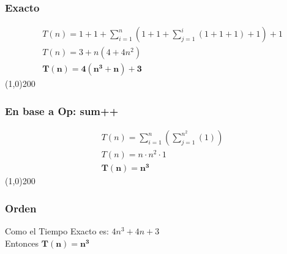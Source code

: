 \documentclass[letterpaper, fleqn]{report}
\begin{document}
\subsubsection*{Exacto}
\begin{align*}
&T(n) = 1+1+\sum_{i=1}^{n}\left(1+1+\sum_{j=1}^{i}{(1+1+1)}+1\right) + 1\\
&T(n) = 3 + n(4 + 4n^2)\\ 
&\mathbf{T(n) = 4(n^3+n)+3}
\end{align*}
\line(1,0){200}
\subsubsection*{En base a Op: sum++}
\begin{align*}
&T(n) = \sum_{i=1}^{n}\left(\sum_{j=1}^{n^2}(1)\right)\\
&T(n) = n \cdot n^2 \cdot 1\\
&\mathbf{T(n) = n^3}
\end{align*}
\line(1,0){200}
\subsubsection*{Orden}
Como el Tiempo Exacto es: $\displaystyle 4n^3 + 4n + 3$\\
Entonces $\mathbf{T(n) = n^3}$
\end{document}
